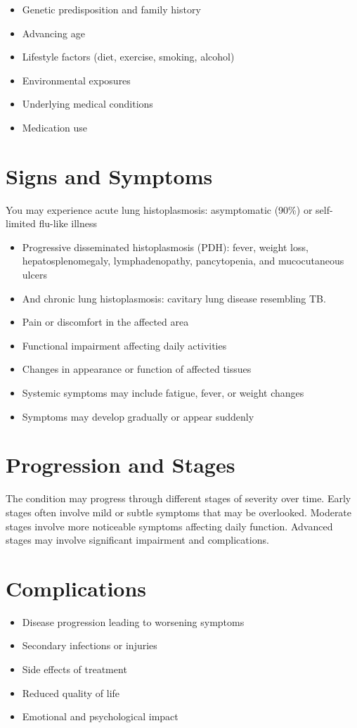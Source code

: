 \begin{itemize}[noitemsep]
  \item Genetic predisposition and family history
  \item Advancing age
  \item Lifestyle factors (diet, exercise, smoking, alcohol)
  \item Environmental exposures
  \item Underlying medical conditions
  \item Medication use
\end{itemize}
\section{Signs and Symptoms}
You may experience acute lung histoplasmosis: asymptomatic (90\%) or self-limited flu-like illness

\begin{itemize}[noitemsep]
  \item Progressive disseminated histoplasmosis (PDH): fever, weight loss, hepatosplenomegaly, lymphadenopathy, pancytopenia, and mucocutaneous ulcers
  \item And chronic lung histoplasmosis: cavitary lung disease resembling TB.
  \item Pain or discomfort in the affected area
  \item Functional impairment affecting daily activities
  \item Changes in appearance or function of affected tissues
  \item Systemic symptoms may include fatigue, fever, or weight changes
  \item Symptoms may develop gradually or appear suddenly
\end{itemize}
\section{Progression and Stages}
The condition may progress through different stages of severity over time. Early stages often involve mild or subtle symptoms that may be overlooked. Moderate stages involve more noticeable symptoms affecting daily function. Advanced stages may involve significant impairment and complications.
\section{Complications}
\begin{itemize}[noitemsep]
  \item Disease progression leading to worsening symptoms
  \item Secondary infections or injuries
  \item Side effects of treatment
  \item Reduced quality of life
  \item Emotional and psychological impact
\end{itemize}
